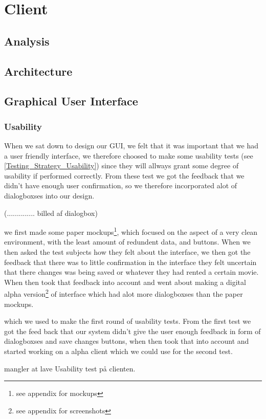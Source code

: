 \section{Client}
\label{Design_Client}

\subsection{Analysis}
\label{Design_Client_Analysis}

\subsection{Architecture}
\label{Design_Client_Architecture}

\subsection{Graphical User Interface}
\label{Design_Client_GUI}

\subsubsection{Usability}
\label{Design_Client_GUI_Usability}
When we sat down to design our GUI, we felt that it was important that we had a user friendly interface, we therefore choosed to make some usability tests (see \ref{Testing_Strategy_Usability}) since they will allways grant some degree of usability if performed correctly.
From these test we got the feedback that we didn't have enough user confirmation, so we therefore incorporated alot of dialogboxses into our design.

(.............. billed af dialogbox)

 we first made some paper mockups\footnote{see appendix for mockups}, which focused on the aspect of a very clean environment, with the least amount of redundent data, and buttons. When we then asked the test subjects how they felt about the interface, we then got the feedback that there was to little confirmation in the interface they felt uncertain that there changes was being saved or whatever they had rented a certain movie. When then took that feedback into account and went about making a digital alpha version\footnote{see appendix for screenshots} of interface which had alot more dialogboxses than the paper mockups.


 which we used to make the first round of usability tests. From the first test we got the feed back that our system didn't give the user enough feedback in form of dialogboxses and save changes buttons, when then took that into account and started working on a alpha client which we could use for the second test.





mangler at lave Usability test på clienten.